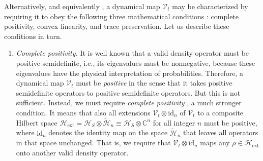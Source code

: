 \documentclass[3p,sort&compress]{elsarticle}
\newcommand{\op}[1]{#1}
\begin{document}
Alternatively, and equivalently \cite{Kraus:1983:ee}, a dynamical map $\mathcal{V}_t$ may be characterized by requiring it to obey the following three mathematical conditions \cite{Breuer:2002:oq,Alicki:2007:uu}: complete positivity, convex linearity, and trace preservation. Let us describe these conditions in turn.

\begin{enumerate} 

\item \emph{Complete positivity.} It is well known that a valid density operator must be positive semidefinite, i.e., its eigenvalues must be nonnegative, because these eigenvalues have the physical interpretation of probabilities. Therefore, a dynamical map $\mathcal{V}_t$ must be \emph{positive} in the sense that it takes positive semidefinite operators to positive semidefinite operators. But this is not sufficient. Instead, we must require \emph{complete positivity} \cite{Kraus:1971:ii,Gorini:1976:tt,Lindblad:1976:um,Breuer:2002:oq,Alicki:2001:aa,Alicki:2007:uu,Benatti:2005:ii}, a much stronger condition. It means that also all extensions $\mathcal{V}_t \otimes \text{id}_n$ of $\mathcal{V}_t$ to a composite Hilbert space $\mathcal{H}_\text{ext} = \mathcal{H}_S \otimes \tilde{\mathcal{H}}_n \equiv \mathcal{H}_S \otimes \mathbb{C}^n$ for all integer $n$ must be positive, where $\text{id}_n$ denotes the identity map on the space $\tilde{\mathcal{H}}_n$ that leaves all operators in that space unchanged. That is, we require that $\mathcal{V}_t \otimes \text{id}_n$ maps any $\op{\rho} \in \mathcal{H}_\text{ext}$ onto another valid density operator. 


\end{enumerate}
\end{document}
